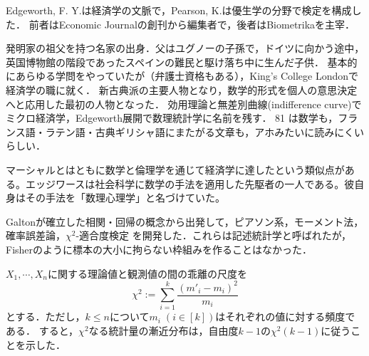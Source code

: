 \documentclass[uplatex,dvipdfmx]{jsreport}
\begin{document}
Edgeworth, F. Y.は経済学の文脈で，Pearson, K.は優生学の分野で検定を構成した．
前者はEconomic Journalの創刊から編集者で，後者はBiometrikaを主宰．

\begin{history}
    発明家の祖父を持つ名家の出身．父はユグノーの子孫で，ドイツに向かう途中，英国博物館の階段であったスペインの難民と駆け落ち中に生んだ子供．
    基本的にあらゆる学問をやっていたが（弁護士資格もある），King's College Londonで経済学の職に就く．
    新古典派の主要人物となり，数学的形式を個人の意思決定へと応用した最初の人物となった．
    効用理論と無差別曲線(indifference curve)でミクロ経済学，Edgeworth展開で数理統計学に名前を残す．
    81 \cite{Edgeworth81}は数学も，フランス語・ラテン語・古典ギリシャ語にまたがる文章も，アホみたいに読みにくいらしい．

    マーシャルとはともに数学と倫理学を通じて経済学に達したという類似点がある。エッジワースは社会科学に数学の手法を適用した先駆者の一人である。彼自身はその手法を「数理心理学」と名づけていた。
\end{history}

\begin{history}
    Galtonが確立した相関・回帰の概念から出発して，ピアソン系，モーメント法，確率誤差論，$\chi^2$-適合度検定
    を開発した．これらは記述統計学と呼ばれたが，Fisherのように標本の大小に拘らない枠組みを作ることはなかった．

    $X_1,\cdots,X_n$に関する理論値と観測値の間の乖離の尺度を
    \[\chi^2:=\sum^k_{i=1}\frac{(m'_i-m_i)^2}{m_i}\]
    とする．ただし，$k\le n$について$m_i\;(i\in[k])$はそれぞれの値に対する頻度である．
    すると，$\chi^2$なる統計量の漸近分布は，自由度$k-1$の$\chi^2(k-1)$に従うことを示した\cite{Pearson00}．
\end{history}
\end{document}
